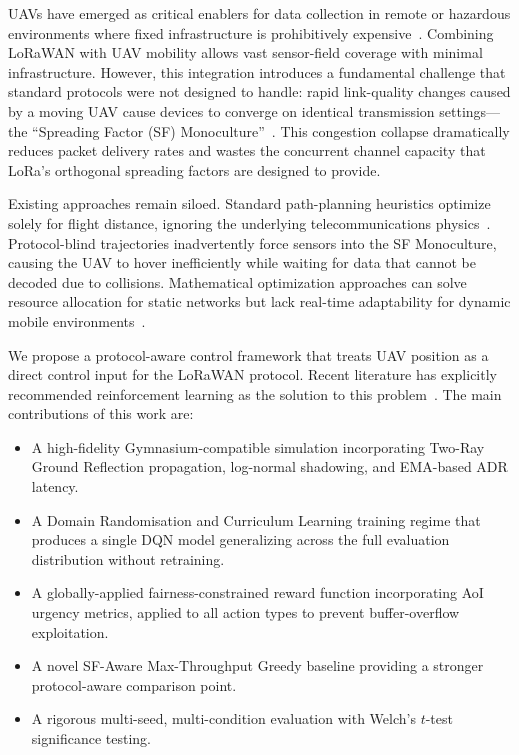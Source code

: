 \documentclass[conference]{IEEEtran}
\begin{document}
UAVs have emerged as critical enablers for data collection in remote or hazardous environments where fixed infrastructure is prohibitively expensive~\cite{b1}. Combining LoRaWAN with UAV mobility allows vast sensor-field coverage with minimal infrastructure. However, this integration introduces a fundamental challenge that standard protocols were not designed to handle: rapid link-quality changes caused by a moving UAV cause devices to converge on identical transmission settings---the ``Spreading Factor (SF) Monoculture''~\cite{b3}. This congestion collapse dramatically reduces packet delivery rates and wastes the concurrent channel capacity that LoRa's orthogonal spreading factors are designed to provide.

Existing approaches remain siloed. Standard path-planning heuristics optimize solely for flight distance, ignoring the underlying telecommunications physics~\cite{b4}. Protocol-blind trajectories inadvertently force sensors into the SF Monoculture, causing the UAV to hover inefficiently while waiting for data that cannot be decoded due to collisions. Mathematical optimization approaches can solve resource allocation for static networks but lack real-time adaptability for dynamic mobile environments~\cite{b3}.

We propose a protocol-aware control framework that treats UAV position as a direct control input for the LoRaWAN protocol. Recent literature has explicitly recommended reinforcement learning as the solution to this problem~\cite{b3,b5}. The main contributions of this work are:
\begin{itemize}
    \item A high-fidelity Gymnasium-compatible simulation incorporating Two-Ray Ground Reflection propagation, log-normal shadowing, and EMA-based ADR latency.
    \item A Domain Randomisation and Curriculum Learning training regime that produces a single DQN model generalizing across the full evaluation distribution without retraining.
    \item A globally-applied fairness-constrained reward function incorporating AoI urgency metrics, applied to all action types to prevent buffer-overflow exploitation.
    \item A novel SF-Aware Max-Throughput Greedy baseline providing a stronger protocol-aware comparison point.
    \item A rigorous multi-seed, multi-condition evaluation with Welch's $t$-test significance testing.
\end{itemize}
\end{document}

